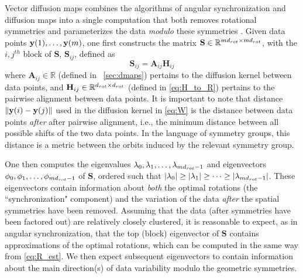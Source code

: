 Vector diffusion maps combines the algorithms of angular synchronization and diffusion maps into a single computation that both removes rotational symmetries and parameterizes the data {\em modulo} these symmetries \cite{singer2012vector}.
%
Given data points $\mathbf{y}(1), \dots, \mathbf{y}(m)$, one first constructs the matrix $\mathbf{S} \in \mathbb{R}^{m d_{rot} \times m d_{rot}}$, with the $i,j^{th}$ block of $\mathbf{S}$, $\mathbf{S}_{ij}$, defined as
\begin{equation} \label{eq:vdm_S}
	\mathbf{S}_{ij} = \mathbf{A}_{ij} \mathbf{H}_{ij}
\end{equation}
%
where $\mathbf{A}_{ij} \in \mathbb{R}$ (defined in \sec~\ref{sec:dmaps}) pertains to the diffusion kernel between data points, and $\mathbf{H}_{ij} \in \mathbb{R}^{d_{rot} \times d_{rot}}$ (defined in \eqref{eq:H_to_R}) pertains to the pairwise alignment between data points.
%
It is important to note that distance $\| \mathbf{y}(i) - \mathbf{y}(j) \|$ used in the diffusion kernel in \eqref{eq:W} is the distance between data points {\it after} after pairwise alignment, i.e., the minimum distance between all possible shifts of the two data points.
%
In the language of symmetry groups, this distance is a metric between the orbits induced by the relevant symmetry group.

One then computes the eigenvalues $\lambda_0, \lambda_1, \dots, \lambda_{m d_{rot}-1}$ and eigenvectors $\phi_0, \allowbreak \phi_1, \dots, \allowbreak \phi_{m d_{rot}-1}$ of $\mathbf{S}$, ordered such that $|\lambda_0| \ge |\lambda_1| \ge \dots \ge |\lambda_{m d_{rot}-1}|$.
%
These eigenvectors contain information about {\it both} the optimal rotations (the ``synchronization" component) and the
variation of the data {\it after} the spatial symmetries have been removed.
%
Assuming that the data (after symmetries have been factored out) are relatively closely clustered, it is reasonable
to expect, as in angular synchronization, that the top (block) eigenvector of $\mathbf{S}$ contains approximations of the optimal rotations,
which can be computed in the same way from \eqref{eq:R_est}.
%
We then expect subsequent eigenvectors to contain information about the main direction(s) of data variability modulo the geometric symmetries.

